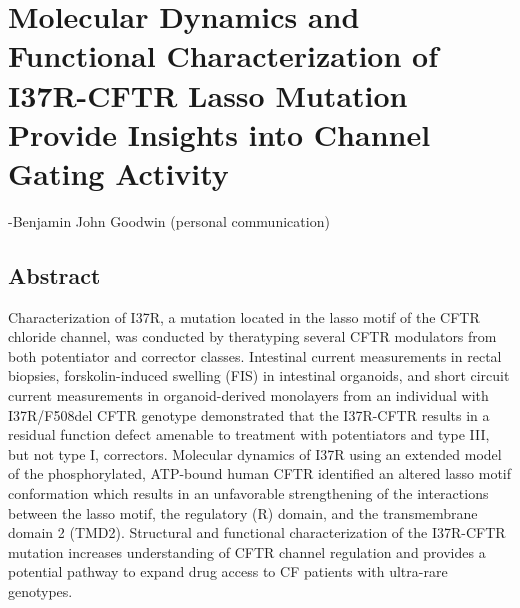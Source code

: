 \chapter{Molecular Dynamics and Functional Characterization of I37R-CFTR Lasso Mutation Provide Insights into Channel Gating Activity}
\label{chap:i37r}
 {-Benjamin John Goodwin (personal communication)}

\section*{\centering Abstract} 

Characterization of I37R, a mutation located in the lasso motif of the CFTR chloride channel, was conducted by theratyping several CFTR modulators from both potentiator and corrector classes. Intestinal current measurements in rectal biopsies, forskolin-induced swelling (FIS) in intestinal organoids, and short circuit current measurements in organoid-derived monolayers from an individual with I37R/F508del CFTR genotype demonstrated that the I37R-CFTR results in a residual function defect amenable to treatment with potentiators and type III, but not type I, correctors. Molecular dynamics of I37R using an extended model of the phosphorylated, ATP-bound human CFTR identified an altered lasso motif conformation which results in an unfavorable strengthening of the interactions between the lasso motif, the regulatory (R) domain, and the transmembrane domain 2 (TMD2). Structural and functional characterization of the I37R-CFTR mutation increases understanding of CFTR channel regulation and provides a potential pathway to expand drug access to CF patients with ultra-rare genotypes.\\

\smallskip

